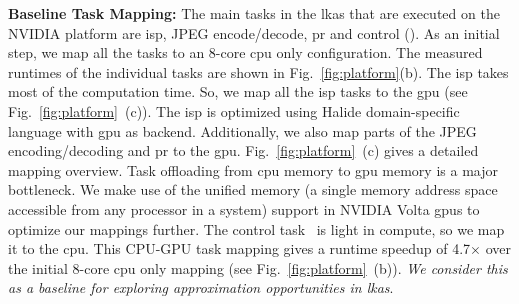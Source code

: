 \par \noindent \textbf{Baseline Task Mapping: } The main tasks in the \gls{lkas}  that are executed on the NVIDIA platform are \gls{isp}, JPEG encode/decode, \gls{pr} and control (\taskC). As an initial step, we map all the tasks to an 8-core \gls{cpu} only configuration. The measured runtimes of the individual tasks are shown in Fig.\ \ref{fig:platform}(b). The \gls{isp} takes most of the computation time. So, we map all the \gls{isp} tasks to the \gls{gpu} (see Fig.\ \ref{fig:platform}~(c)). The \gls{isp} is optimized using Halide \cite{halide} domain-specific language with \gls{gpu} as backend. Additionally, we also map parts of the JPEG encoding/decoding and \gls{pr} to the \gls{gpu}. Fig.\ \ref{fig:platform}~(c) gives a detailed mapping overview. Task offloading from \gls{cpu} memory to \gls{gpu} memory is a major bottleneck. We make use of the unified memory (a single memory address space accessible from any processor in a system) support in NVIDIA Volta \glspl{gpu} to optimize our mappings further. The control task \taskC\ is light in compute, so we map it to the \gls{cpu}. This CPU-GPU task mapping gives a runtime speedup of 4.7$\times$ over the initial 8-core \gls{cpu} only mapping (see Fig.\ \ref{fig:platform}~(b)). \textit{We consider this as a baseline for exploring approximation opportunities in \gls{lkas}}.